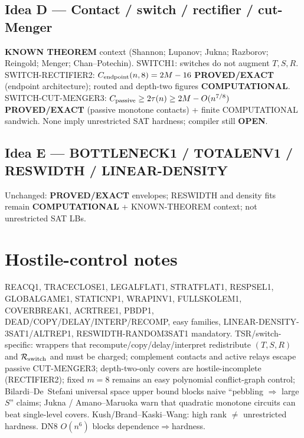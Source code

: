 \documentclass[11pt]{article}
\begin{document}
\subsection*{Idea D --- Contact / switch / rectifier / cut-Menger}
\textbf{KNOWN THEOREM} context (Shannon; Lupanov; Jukna; Razborov; Reingold; Menger; Chan--Potechin).
SWITCH1: switches do not augment $T,S,R$.
SWITCH-RECTIFIER2: $C_{\rm endpoint}(n,8)=2M-16$ \textbf{PROVED/EXACT} (endpoint architecture);
routed and depth-two figures \textbf{COMPUTATIONAL}.
SWITCH-CUT-MENGER3: $C_{\rm passive}\ge 2\tau(n)\ge 2M-O(n^{7/8})$ \textbf{PROVED/EXACT}
(passive monotone contacts) + finite COMPUTATIONAL sandwich.
None imply unrestricted SAT hardness; compiler still \textbf{OPEN}.

\subsection*{Idea E --- BOTTLENECK1 / TOTALENV1 / RESWIDTH / LINEAR-DENSITY}
Unchanged: \textbf{PROVED/EXACT} envelopes; RESWIDTH and density fits remain
\textbf{COMPUTATIONAL} + KNOWN-THEOREM context; not unrestricted SAT LBs.

\section*{Hostile-control notes}
REACQ1, TRACECLOSE1, LEGALFLAT1, STRATFLAT1, RESPSEL1, GLOBALGAME1, STATICNP1, WRAPINV1,
FULLSKOLEM1, COVERBREAK1, ACRTREE1, PBDP1, DEAD/COPY/DELAY/INTERP/RECOMP, easy families,
LINEAR-DENSITY-3SAT1/ALTREP1, RESWIDTH-RANDOM3SAT1 mandatory.
TSR/switch-specific: wrappers that recompute/copy/delay/interpret redistribute $(T,S,R)$ and
$\mathcal R_{\rm switch}$ and must be charged; complement contacts and active relays escape
passive CUT-MENGER3; depth-two-only covers are hostile-incomplete (RECTIFIER2);
fixed $m=8$ remains an easy polynomial conflict-graph control;
Bilardi--De~Stefani universal space upper bound blocks naive ``pebbling $\Rightarrow$ large $S$'' claims;
Jukna / Amano--Maruoka warn that quadratic monotone circuits can beat single-level covers.
Kush/Brand--Kaski--Wang: high rank $\neq$ unrestricted hardness.
DN8 $O(n^6)$ blocks dependence$\Rightarrow$hardness.
\end{document}
